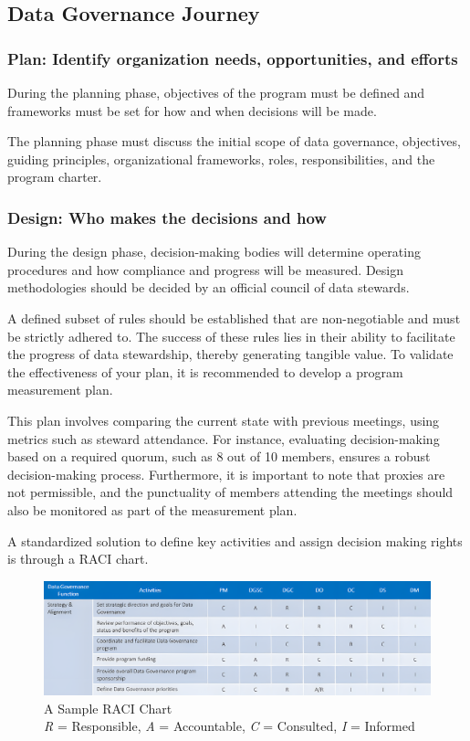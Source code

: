 \subsection{Data Governance Journey}

\subsubsection{Plan: Identify organization needs, opportunities, and efforts}
During the planning phase, objectives of the program must be defined and frameworks must be set for how and when decisions will be made.

The planning phase must discuss the initial scope of data governance, objectives, guiding principles, organizational frameworks, roles, responsibilities, and the program charter.  

\subsubsection{Design: Who makes the decisions and how}
During the design phase, decision-making bodies will determine operating procedures and how
compliance and progress will be measured. Design methodologies should be decided by an official council of data stewards. 

A defined subset of rules should be established that are non-negotiable and must be strictly adhered to. The success of these rules lies in their ability to facilitate the progress of data stewardship, thereby generating tangible value. To validate the effectiveness of your plan, it is recommended to develop a program measurement plan.

This plan involves comparing the current state with previous meetings, using metrics such as steward attendance. For instance, evaluating decision-making based on a required quorum, such as 8 out of 10 members, ensures a robust decision-making process. Furthermore, it is important to note that proxies are not permissible, and the punctuality of members attending the meetings should also be monitored as part of the measurement plan.

A standardized solution to define key activities and assign decision making rights is through a RACI chart. 

\begin{figure}[H]
    \centering
    \includegraphics[scale=0.143]{images/RACI-example.png}
    \caption{A Sample RACI Chart \\ \textit{R} = Responsible, \textit{A} = Accountable, \textit{C} = Consulted, \textit{I} = Informed}
    \label{RACI-example}
\end{figure}

